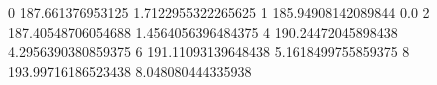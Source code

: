 0 187.661376953125 1.7122955322265625
1 185.94908142089844 0.0
2 187.40548706054688 1.4564056396484375
4 190.24472045898438 4.2956390380859375
6 191.11093139648438 5.1618499755859375
8 193.99716186523438 8.048080444335938

